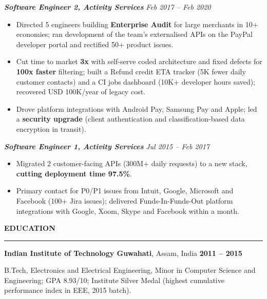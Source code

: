 \documentclass[10pt,a4paper]{article}
\newcommand{\bd}[1]{\textbf{#1}}
\newcommand{\sect}[1]{%
  \par\vspace{8pt}%
  {\bfseries\fontsize{10.8}{12.5}\selectfont #1}\par\nointerlineskip
  \vspace{1.5pt}\noindent\rule{\linewidth}{0.6pt}\par\vspace{4pt}}
\newcommand{\role}[2]{%
  \par\vspace{5pt}\noindent\textcolor{rolecolor}{\textbf{\textit{#1}}}\hfill
  \textcolor{rolecolor}{\textit{#2}}\par\nopagebreak}
\begin{document}
\role{Software Engineer 2, Activity Services}{Feb 2017 -- Feb 2020}
\begin{itemize}
\item Directed 5 engineers building \bd{Enterprise Audit} for large merchants in 10+ economies;
  ran development of the team's externalised APIs on the PayPal developer portal and rectified
  50+ product issues.
\item Cut time to market \bd{3x} with self-serve coded architecture and fixed defects for
  \bd{100x faster} filtering; built a Refund credit ETA tracker (5K fewer daily customer contacts)
  and a CI jobs dashboard (10K+ developer hours saved); recovered USD 100K/year of legacy cost.
\item Drove platform integrations with Android Pay, Samsung Pay and Apple; led a \bd{security
  upgrade} (client authentication and classification-based data encryption in transit).
\end{itemize}

\role{Software Engineer 1, Activity Services}{Jul 2015 -- Feb 2017}
\begin{itemize}
\item Migrated 2 customer-facing APIs (300M+ daily requests) to a new stack,
  \bd{cutting deployment time 97.5\%}.
\item Primary contact for P0/P1 issues from Intuit, Google, Microsoft and Facebook (100+ Jira
  issues); delivered Funds-In-Funds-Out platform integrations with Google, Xoom, Skype and
  Facebook within a month.
\end{itemize}

\sect{EDUCATION}
\noindent\textbf{Indian Institute of Technology Guwahati}, Assam, India \hfill \textbf{2011 -- 2015}\par
B.Tech, Electronics and Electrical Engineering, Minor in Computer Science and Engineering;
GPA 8.93/10; Institute Silver Medal (highest cumulative performance index in EEE, 2015 batch).\par
\end{document}
